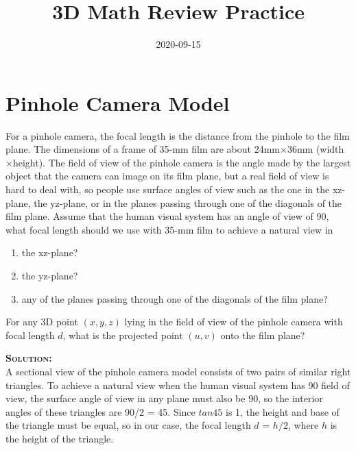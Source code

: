\documentclass[11pt]{article}  %
\title{3D Math Review Practice}
\author{\href{mailto:neo-mashiro@hotmail.com}{\color{purple}{Wentao Lu}}}
\date{2020-09-15}
\begin{document}
    \newcommand{\solution}{\noindent \textbf{\textsc{Solution:}} \dotfill \vspace{2mm}}  %

    \maketitle

\section{Pinhole Camera Model}
    For a pinhole camera, the focal length is the distance from the pinhole to the film plane. The dimensions of a frame of 35-mm film are about 24mm$\times$36mm (width$\times$height). The field of view of the pinhole camera is the angle made by the largest object that the camera can image on its film plane, but a real field of view is hard to deal with, so people use surface angles of view such as the one in the xz-plane, the yz-plane, or in the planes passing through one of the diagonals of the film plane. Assume that the human visual system has an angle of view of 90\textdegree, what focal length should we use with 35-mm film to achieve a natural view in
    \begin{enumerate}[itemsep=0mm]
        \item the xz-plane?
        \item the yz-plane?
        \item any of the planes passing through one of the diagonals of the film plane?
    \end{enumerate}
    For any 3D point $(x,y,z)$ lying in the field of view of the pinhole camera with focal length $d$, what is the projected point $(u,v)$ onto the film plane?\vspace{3mm}

\solution\\
    A sectional view of the pinhole camera model consists of two pairs of similar right triangles. To achieve a natural view when the human visual system has 90\textdegree\hspace{0pt} field of view, the surface angle of view in any plane must also be 90\textdegree, so the interior angles of these triangles are 90/2 = 45\textdegree. Since $tan45$ is 1, the height and base of the triangle must be equal, so in our case, the focal length $d$ = $h/2$, where $h$ is the height of the triangle.\\
\end{document}
